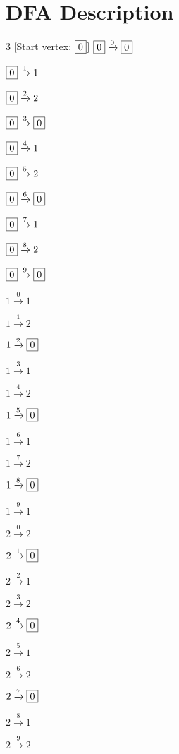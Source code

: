 \documentclass[12pt]{article}
\begin{document}
 
\section* {DFA Description} 
\begin {multicols}{3} 
[Start vertex: $\fbox{0}$]
$\fbox{0} \xrightarrow{0} \fbox{0}$

$\fbox{0} \xrightarrow{1} 1$

$\fbox{0} \xrightarrow{2} 2$

$\fbox{0} \xrightarrow{3} \fbox{0}$

$\fbox{0} \xrightarrow{4} 1$

$\fbox{0} \xrightarrow{5} 2$

$\fbox{0} \xrightarrow{6} \fbox{0}$

$\fbox{0} \xrightarrow{7} 1$

$\fbox{0} \xrightarrow{8} 2$

$\fbox{0} \xrightarrow{9} \fbox{0}$

$1 \xrightarrow{0} 1$

$1 \xrightarrow{1} 2$

$1 \xrightarrow{2} \fbox{0}$

$1 \xrightarrow{3} 1$

$1 \xrightarrow{4} 2$

$1 \xrightarrow{5} \fbox{0}$

$1 \xrightarrow{6} 1$

$1 \xrightarrow{7} 2$

$1 \xrightarrow{8} \fbox{0}$

$1 \xrightarrow{9} 1$

$2 \xrightarrow{0} 2$

$2 \xrightarrow{1} \fbox{0}$

$2 \xrightarrow{2} 1$

$2 \xrightarrow{3} 2$

$2 \xrightarrow{4} \fbox{0}$

$2 \xrightarrow{5} 1$

$2 \xrightarrow{6} 2$

$2 \xrightarrow{7} \fbox{0}$

$2 \xrightarrow{8} 1$

$2 \xrightarrow{9} 2$


\end{multicols}
\end{document}
